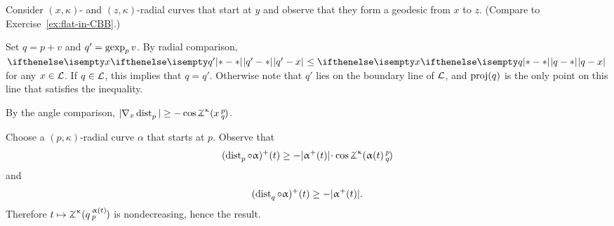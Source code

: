 Consider $(x,\kappa)$- and $(z,\kappa)$-radial curves that start at $y$
and observe that they form a geodesic from $x$ to $z$.
(Compare to Exercise~\ref{ex:flat-in-CBB}.)

 Set $q=p+v$ and $q'=\mathop{\rm gexp}\nolimits_pv$. 
By radial comparison, $\dist{q'}{x}{}\le \dist{q}{x}{}$ for any $x\in \spc{L}$.
If $q\in \spc{L}$, this implies that $q=q'$.
Otherwise note that $q'$ lies on the boundary line of $\mathcal{L}$, and $\mathop{\rm proj}\nolimits(q)$ is the only point on this line that satisfies the inequality.

By the angle comparison,
$|\nabla_x\distfun p|\ge-\cos \angk\kappa xpq$.

Choose a $(p,\kappa)$-radial curve $\alpha$ that starts at $p$.
Observe that 
\[(\distfun p\circ \alpha)^+(t)\ge-|\alpha^+(t)|\cdot \cos \angk\kappa {\alpha(t)}p q\]
and
\[(\distfun q\circ\alpha)^+(t)\ge -|\alpha^+(t)|.\]
Therefore $t\mapsto\angk\kappa q{\alpha(t)}p$  is nondecreasing, hence the result.



